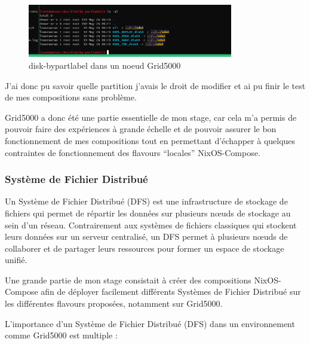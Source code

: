 \documentclass[a4paper,french,12pt, titlepage]{article}
\begin{document}
\begin{figure}[h]
\centering
\includegraphics[width=0.8\textwidth,height=0.8\textheight,keepaspectratio]{annexe/disk_g5k.png}
\caption{disk-bypartlabel dans un noeud Grid5000}
\end{figure}

J'ai donc pu savoir quelle partition j'avais le droit de modifier et ai
pu finir le test de mes compositions sans problème.\newline

Grid5000 a donc été une partie essentielle de mon stage, car cela m'a
permis de pouvoir faire des expériences à grande échelle et de pouvoir
assurer le bon fonctionnement de mes compositions tout en permettant
d'échapper à quelques contraintes de fonctionnement des flavours
``locales'' NixOS-Compose.\newline

\hypertarget{systuxe8me-de-fichier-distribuuxe9}{%
\subsubsection{Système de Fichier
Distribué}\label{systuxe8me-de-fichier-distribuuxe9}}

Un Système de Fichier Distribué (DFS) est une infrastructure de stockage
de fichiers qui permet de répartir les données sur plusieurs nœuds de
stockage au sein d'un réseau. Contrairement aux systèmes de fichiers
classiques qui stockent leurs données sur un serveur centralisé, un DFS
permet à plusieurs nœuds de collaborer et de partager leurs ressources
pour former un espace de stockage unifié.\newline

Une grande partie de mon stage consistait à créer des compositions
NixOS-Compose afin de déployer facilement différents Systèmes de Fichier
Distribué sur les différentes flavours proposées, notamment sur
Grid5000.\newline

L'importance d'un Système de Fichier Distribué (DFS) dans un
environnement comme Grid5000 est multiple :\newline
\end{document}
